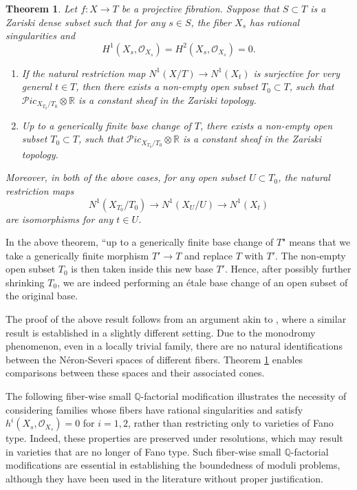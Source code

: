\documentclass[11pt,oneside,reqno]{amsart}
\numberwithin{equation}{section}
\newtheorem{theorem}[proposition]{Theorem}
\theoremstyle{definition}
\newcommand{\bQ}{\mathbb{Q}}
\newcommand{\bR}{\mathbb{R}}
\newcommand{\mO}{\mathcal{O}}
\newcommand{\mP}{\mathcal{P}}
\begin{document}
\begin{theorem}\label{thm: deform pic}
Let $f: X \to T$ be a projective fibration. Suppose that $S\subset T$ is a Zariski dense subset such that for any $s\in S$, the fiber $X_s$ has rational singularities and
\[
H^1(X_s, \mO_{X_s})=H^2(X_s, \mO_{X_s})=0.
\] 
\begin{enumerate}
    \item If the natural restriction map $N^1(X/T) \to N^1(X_t)$ is surjective for very general $t\in T$, then there exists a non-empty open subset $T_0\subset T$, such that ${\mP}ic_{X_{T_0}/T_0} \otimes \bR$ is a constant sheaf in the Zariski topology.
    \item Up to a generically finite base change of $T$, there exists a non-empty open subset $T_0\subset T$, such that ${\mP}ic_{X_{T_0}/T_0} \otimes \bR$ is a constant sheaf in the Zariski topology. 
\end{enumerate} 
Moreover, in both of the above cases, for any open subset $U\subset T_0$, the natural restriction maps
\[
N^1(X_{T_0}/T_0) \to N^1(X_U/U) \to N^1(X_t)
\] are isomorphisms for any $t\in U$.
\end{theorem}

In the above theorem, ``up to a generically finite base change of $T$" means that we take a generically finite morphism $T' \to T$ and replace $T$ with $T'$. The non-empty open subset $T_0$ is then taken inside this new base $T'$. Hence, after possibly further shrinking $T_0$, we are indeed performing an \'etale base change of an open subset of the original base. 

The proof of the above result follows from an argument akin to \cite[\S 6]{dFH11}, where a similar result is established in a slightly different setting. Due to the monodromy phenomenon, even in a locally trivial family, there are no natural identifications between the N\'eron-Severi spaces of different fibers. Theorem \ref{thm: deform pic} enables comparisons between these spaces and their associated cones. 

The following fiber-wise small $\bQ$-factorial modification illustrates the necessity of considering families whose fibers have rational singularities and satisfy $h^i(X_s, \mO_{X_s}) = 0$ for $i = 1, 2$, rather than restricting only to varieties of Fano type. Indeed, these properties are preserved under resolutions, which may result in varieties that are no longer of Fano type. Such fiber-wise small $\bQ$-factorial modifications are essential in establishing the boundedness of moduli problems, although they have been used in the literature without proper justification.
\end{document}
